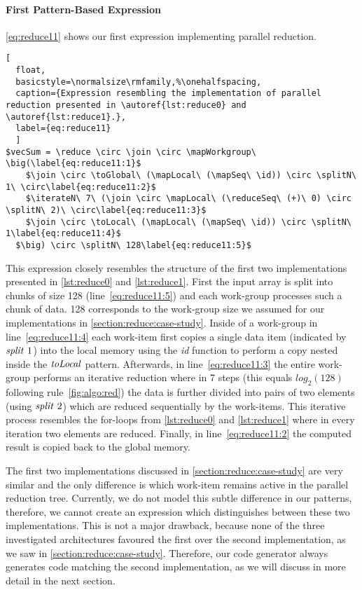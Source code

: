 \paragraph{First Pattern-Based Expression}
\autoref{eq:reduce11} shows our first expression implementing parallel reduction.
\begin{lstlisting}[
  float,
  basicstyle=\normalsize\rmfamily,%\onehalfspacing,
  caption={Expression resembling the implementation of parallel reduction presented in \autoref{lst:reduce0} and \autoref{lst:reduce1}.},
  label={eq:reduce11}
  ]
$vecSum = \reduce \circ \join \circ \mapWorkgroup\ \big(\label{eq:reduce11:1}$
    $\join \circ \toGlobal\ (\mapLocal\ (\mapSeq\ \id)) \circ \splitN\ 1\ \circ\label{eq:reduce11:2}$
    $\iterateN\ 7\ (\join \circ \mapLocal\ (\reduceSeq\ (+)\ 0) \circ \splitN\ 2)\ \circ\label{eq:reduce11:3}$
    $\join \circ \toLocal\ (\mapLocal\ (\mapSeq\ \id)) \circ \splitN\ 1\label{eq:reduce11:4}$
  $\big) \circ \splitN\ 128\label{eq:reduce11:5}$
\end{lstlisting}
%
This expression closely resembles the structure of the first two implementations presented in \autoref{lst:reduce0} and \autoref{lst:reduce1}.
First the input array is split into chunks of size 128 (line~\ref{eq:reduce11:5}) and each work-group processes such a chunk of data.
128 corresponds to the work-group size we assumed for our implementations in \autoref{section:reduce:case-study}.
Inside of a work-group in line~\ref{eq:reduce11:4} each work-item first copies a single data item (indicated by $\text{\textit{split}}\ 1$) into the local memory using the \textit{id} function to perform a copy nested inside the $\text{\textit{toLocal}}$ pattern.
Afterwards, in line~\ref{eq:reduce11:3} the entire work-group performs an iterative reduction where in 7 steps (this equals $log_2(128)$ following rule~\ref{fig:algo:red}) the data is further divided into pairs of two elements (using $\text{\textit{split}}\ 2$) which are reduced sequentially by the work-items.
This iterative process resembles the for-loops from \autoref{lst:reduce0} and \autoref{lst:reduce1} where in every iteration two elements are reduced.
Finally, in line~\ref{eq:reduce11:2} the computed result is copied back to the global memory.

The first two implementations discussed in \autoref{section:reduce:case-study} are very similar and the only difference is which work-item remains active in the parallel reduction tree.
Currently, we do not model this subtle difference in our patterns, therefore, we cannot create an expression which distinguishes between these two implementations.
This is not a major drawback, because none of the three investigated architectures favoured the first over the second implementation, as we saw in \autoref{section:reduce:case-study}.
Therefore, our code generator always generates code matching the second implementation, as we will discuss in more detail in the next section.


